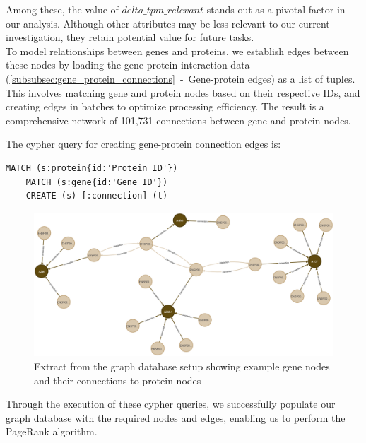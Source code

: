 Among these, the value of $delta\_tpm\_relevant$ stands out as a pivotal factor in our analysis.
Although other attributes may be less relevant to our current investigation, they retain potential value for future tasks.\\

To model relationships between genes and proteins,
we establish edges between these nodes by loading the gene-protein interaction data
(\cref{subsubsec:gene_protein_connections}~-~Gene-protein edges) as a list of tuples.
This involves matching gene and protein nodes based on their respective IDs,
and creating edges in batches to optimize processing efficiency.
The result is a comprehensive network of 101,731 connections between gene and protein nodes.

The cypher query for creating gene-protein connection edges is:
\begin{lstlisting}[language=Cypher, label={lst:gene_protein_edges}]
    MATCH (s:protein{id:'Protein ID'})
    MATCH (s:gene{id:'Gene ID'})
    CREATE (s)-[:connection]-(t)
\end{lstlisting}

\begin{figure}[h]
    \centering
    \includegraphics[width=1\textwidth]{figures/03_02_Network_2}
    \caption{Extract from the graph database setup showing example gene nodes and their connections to protein nodes}
    \label{fig:03_02_Network_2}
\end{figure}

Through the execution of these cypher queries,
we successfully populate our graph database with the required nodes and edges, enabling us to perform the PageRank algorithm.\\